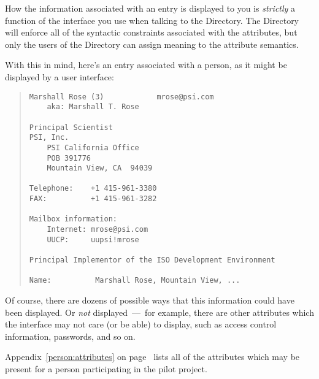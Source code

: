 How the information associated with an entry is displayed to you
is {\em strictly\/} a function of the interface you use when talking to the
Directory.
The Directory will enforce all of the syntactic constraints associated with
the attributes,
but only the users of the Directory can assign meaning to the attribute
semantics.

With this in mind,
here's an entry associated with a person,
as it might be displayed by a user interface:
\begin{quote}\small\begin{verbatim}
Marshall Rose (3)            mrose@psi.com
    aka: Marshall T. Rose

Principal Scientist
PSI, Inc.
    PSI California Office
    POB 391776
    Mountain View, CA  94039

Telephone:    +1 415-961-3380
FAX:          +1 415-961-3282

Mailbox information:
    Internet: mrose@psi.com
    UUCP:     uupsi!mrose

Principal Implementor of the ISO Development Environment

Name:          Marshall Rose, Mountain View, ...
\end{verbatim}\end{quote}
Of course,
there are dozens of possible ways that this information could have been
displayed.
Or {\em not\/} displayed~---~for example,
there are other attributes which the interface may not care (or be able) to
display,
such as access control information, passwords, and so on.

Appendix~\ref{person:attributes} on page~\pageref{person:attributes} lists all
of the attributes which may be present for a person participating in the pilot
project.
